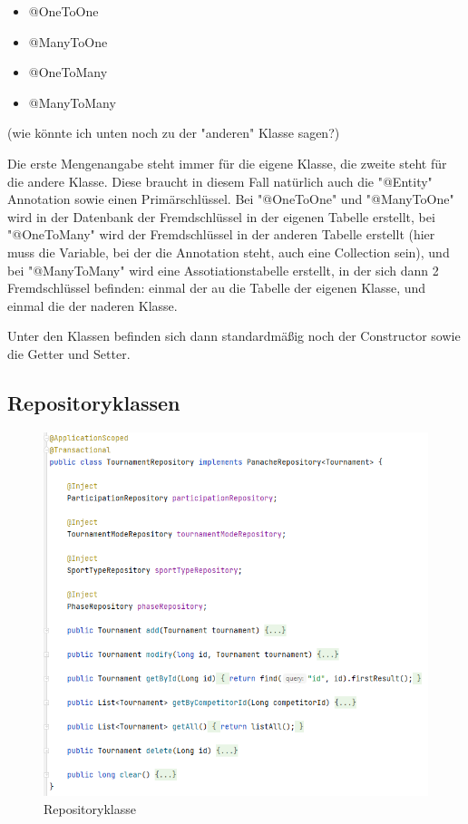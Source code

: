 \begin{itemize}
    \item @OneToOne
    \item @ManyToOne
    \item @OneToMany
    \item @ManyToMany
\end{itemize}

(wie könnte ich unten noch zu der "anderen" Klasse sagen?)

Die erste Mengenangabe steht immer für die eigene Klasse, die zweite steht für die andere Klasse. Diese braucht in diesem Fall natürlich auch die "@Entity" Annotation sowie einen Primärschlüssel. 
Bei "@OneToOne" und "@ManyToOne" wird in der Datenbank der Fremdschlüssel in der eigenen Tabelle erstellt, bei "@OneToMany" wird der Fremdschlüssel in der anderen Tabelle 
erstellt (hier muss die Variable, bei der die Annotation steht, auch eine Collection sein), und bei "@ManyToMany" wird eine Assotiationstabelle erstellt, in der sich dann 2 Fremdschlüssel befinden: 
einmal der au die Tabelle der eigenen Klasse, und einmal die der naderen Klasse.

Unter den Klassen befinden sich dann standardmäßig noch der Constructor sowie die Getter und Setter.

\subsection{Repositoryklassen}

\begin{figure}[H]
    \includegraphics[scale=0.8]{pics/backend/repository_class.png}
    \caption{Repositoryklasse}
\end{figure}

